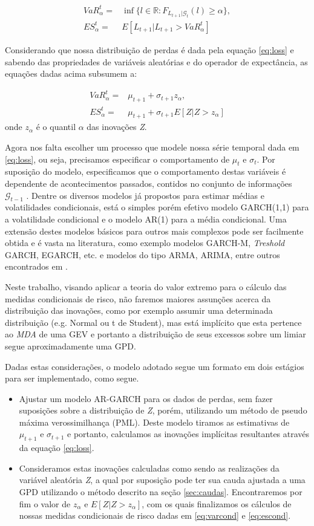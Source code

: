 \documentclass[review]{elsarticle}
\theoremstyle{definition}
\begin{document}
\begin{align}
VaR_\alpha^t=&\inf\{l \in \mathbb{R}: F_{L_{t+1} | \mathcal{G}_t}(l) \geq \alpha\}, \\
ES_\alpha^t=&E[L_{t+1} | L_{t+1} > VaR_\alpha^t]
\end{align}

Considerando que nossa distribuição de perdas é dada pela equação \eqref{eq:loss} e sabendo das propriedades de variáveis aleatórias e do operador de expectância, as equações dadas acima subsumem a:

\begin{align}
VaR_\alpha^t=&\mu_{t+1}+\sigma_{t+1}z_\alpha, \label{eq:varcond} \\
ES_\alpha^t=&\mu_{t+1}+\sigma_{t+1}E[Z | Z>z_\alpha] \label{eq:escond}
\end{align}
onde $z_\alpha$ é o quantil $\alpha$ das inovações \emph{Z}.

Agora nos falta escolher um processo que modele nossa série temporal dada em \eqref{eq:loss}, ou seja, precisamos especificar o comportamento de $\mu_t$ e $\sigma_t$. Por suposição do modelo, especificamos que o comportamento destas variáveis é dependente de acontecimentos passados, contidos no conjunto de informações  $\mathcal{G}_{t-1}$ . Dentre os diversos modelos já propostos para estimar médias e volatilidades condicionais, está o simples porém efetivo modelo GARCH(1,1) para a volatilidade condicional e o modelo AR(1) para a média condicional. Uma extensão destes modelos básicos para outros mais complexos pode ser facilmente obtida e é vasta na literatura, como exemplo modelos GARCH-M, \emph{Treshold} GARCH, EGARCH, etc. e modelos do tipo ARMA, ARIMA, entre outros encontrados em \cite{Tsay2010}. 

Neste trabalho, visando aplicar a teoria do valor extremo para o cálculo das medidas condicionais de risco, não faremos maiores assunções acerca da distribuição das inovações, como por exemplo assumir uma determinada distribuição (e.g. Normal ou t de Student), mas está implícito que esta pertence ao \emph{MDA} de uma GEV e portanto a distribuição de seus excessos sobre um limiar segue aproximadamente uma GPD.

Dadas estas considerações, o modelo adotado segue um formato em dois estágios para ser implementado, como segue.
\begin{itemize}
	\item Ajustar um modelo AR-GARCH para os dados de perdas, sem fazer suposições sobre a distribuição de \emph{Z}, porém, utilizando um método de pseudo máxima verossimilhança (PML). Deste modelo tiramos as estimativas de $\mu_{t+1}$ e $\sigma_{t+1}$ e portanto, calculamos as inovações implícitas resultantes através da equação \eqref{eq:loss}.
	\item Consideramos estas inovações calculadas como sendo as realizações da variável aleatória \emph{Z}, a qual por suposição pode ter sua cauda ajustada a uma GPD utilizando o método descrito na seção \ref{sec:caudas}. Encontraremos por fim o valor de $z_\alpha$ e $E[Z|Z>z_\alpha]$, com os quais finalizamos os cálculos de nossas medidas condicionais de risco dadas em \eqref{eq:varcond} e \eqref{eq:escond}.
\end{itemize}
\end{document}
